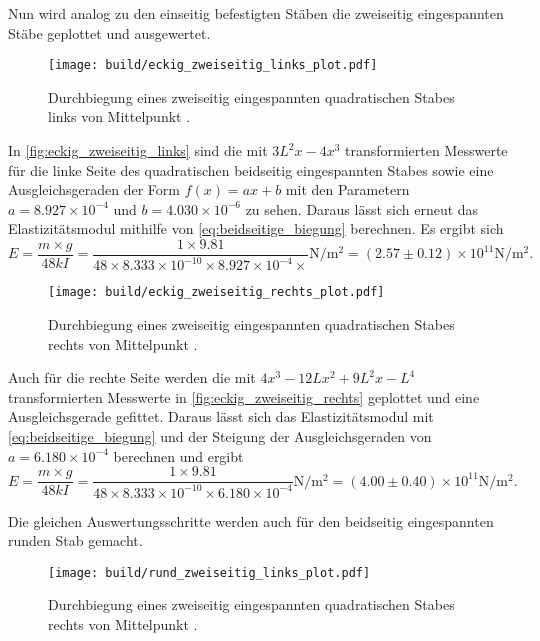 \noindent Nun wird analog zu den einseitig befestigten Stäben die zweiseitig eingespannten Stäbe geplottet und ausgewertet.
\begin{figure}[H]
  \centering
  \texttt{[image: build/eckig\_zweiseitig\_links\_plot.pdf]}
  \caption{Durchbiegung eines zweiseitig eingespannten quadratischen Stabes links von Mittelpunkt \cite{V103}.}
  \label{fig:eckig_zweiseitig_links}
\end{figure}
\noindent In \autoref{fig:eckig_zweiseitig_links} sind die mit $3L^2x-4x^3$ transformierten Messwerte für die linke Seite des quadratischen beidseitig eingespannten Stabes sowie eine Ausgleichsgeraden der Form $f(x)=ax+b$ mit den Parametern $a=8.927\times 10^{-4}$ und $b=4.030\times 10^{-6}$ zu sehen. Daraus lässt sich erneut das Elastizitätsmodul mithilfe von \autoref{eq:beidseitige_biegung} berechnen. Es ergibt sich
\begin{equation*}
  E=\frac{m \times g}{48kI} = \frac{1 \times 9.81}{48 \times 8.333 \times 10^{-10} \times 8.927 \times 10^{-4} \times} \unit{\newton\per\meter\squared} = (2.57 \pm 0.12) \times 10^{11} \unit{\newton\per\meter\squared}.
\end{equation*}

\begin{figure}[H]
  \centering
  \texttt{[image: build/eckig\_zweiseitig\_rechts\_plot.pdf]}
  \caption{Durchbiegung eines zweiseitig eingespannten quadratischen Stabes rechts von Mittelpunkt \cite{V103}.}
  \label{fig:eckig_zweiseitig_rechts}
\end{figure}

\noindent Auch für die rechte Seite werden die mit $4x^3-12Lx^2+9L^2x-L^4$ transformierten Messwerte in \autoref{fig:eckig_zweiseitig_rechts} geplottet und eine Ausgleichsgerade gefittet. Daraus lässt sich das Elastizitätsmodul mit \autoref{eq:beidseitige_biegung} und der Steigung der Ausgleichsgeraden von $a=6.180 \times 10^{-4}$ berechnen und ergibt
\begin{equation*}
  E=\frac{m \times g}{48kI} = \frac{1 \times 9.81}{48 \times 8.333 \times 10^{-10} \times 6.180 \times 10^{-4}} \unit{\newton\per\meter\squared} = (4.00 \pm 0.40) \times 10^{11} \unit{\newton\per\meter\squared}\text{.}
\end{equation*}

\noindent Die gleichen Auswertungsschritte werden auch für den beidseitig eingespannten runden Stab gemacht.


\begin{figure}[H]
  \centering
  \texttt{[image: build/rund\_zweiseitig\_links\_plot.pdf]}
  \caption{Durchbiegung eines zweiseitig eingespannten quadratischen Stabes rechts von Mittelpunkt \cite{V103}.}
  \label{fig:rund_zweiseitig_links}
\end{figure}

